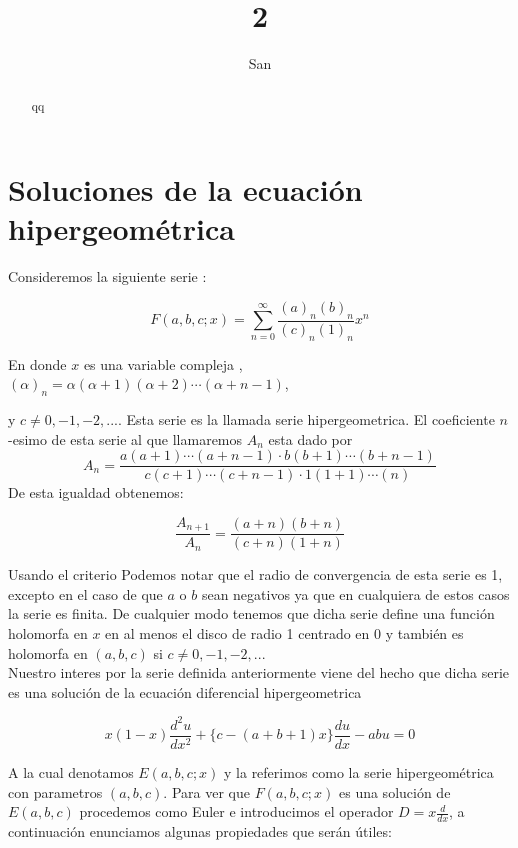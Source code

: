 \documentclass[12pt]{article}
\theoremstyle{definition}
\theoremstyle{remark}
\numberwithin{equation}{section}
\begin{document}
\title[1]{2}%
\author{San}%

\begin{abstract}
  qq
\end{abstract}
\maketitle
\section{Soluciones de la ecuaci\'on hipergeom\'etrica }

Consideremos la siguiente serie :

$$F(a,b,c;x)= \sum_{n=0}^{\infty } \frac{(a)_{n} (b)_{n}}{(c)_{n}(1)_{n}} x^{n}$$

En donde $x$ es una variable compleja , $(\alpha)_{n} = \alpha (\alpha +1)(\alpha +2)\cdots (\alpha +n-1)$, %

y $c \neq 0, -1, -2,...$. Esta serie es la llamada serie hipergeometrica.  El coeficiente $n$-esimo de esta serie al que llamaremos $A_{n}$ esta dado por $$A_{n}=\frac{a(a+1)\cdots (a+n-1) \cdot b(b+1)\cdots(b +n -1) }{c(c+1)\cdots (c+n-1) \cdot 1 (1+1) \cdots (n)}$$ De esta igualdad obtenemos:

$$\frac{A_{n+1}}{A_{n}}= \frac{(a+n)(b+n)}{(c+n)(1+n)}$$

Usando el criterio %
Podemos notar que el radio de convergencia de esta serie es 1, excepto en el caso de que $a$ o $b$ sean negativos ya que en cualquiera de estos casos la serie es finita. De cualquier modo tenemos que dicha serie define una funci\'on holomorfa en $x$ en al menos el disco de radio 1 centrado en 0 y tambi\'en es holomorfa en $(a,b,c)$ si $c \neq 0, -1, -2,...$ \\

Nuestro interes por la serie definida anteriormente viene del hecho que dicha serie es una soluci\'on de la ecuaci\'on diferencial hipergeometrica

$$ x(1-x)\frac{d^{2}u}{dx^{2}} + \lbrace c- (a+b+1)x \rbrace \frac{du}{dx} -abu=0 $$

 A la cual denotamos $E(a,b,c;x)$ y la referimos como la serie hipergeom\'etrica con parametros $(a,b,c)$. Para ver que $F(a,b,c;x)$ es una soluci\'on de $E(a,b,c)$ procedemos como Euler e introducimos el operador $ D = x \frac{d}{dx}$, a continuaci\'on  enunciamos algunas  propiedades que ser\'an \'utiles:
\end{document}
